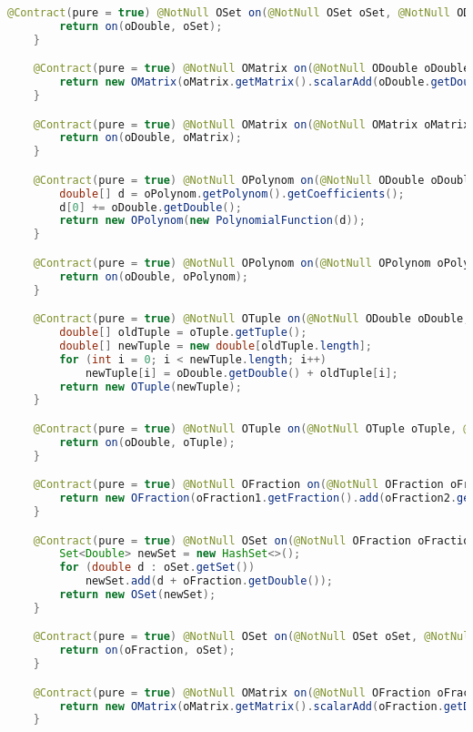 \begin{lstlisting}[caption=Plus (Falk),label=list:Plus,language=Java]
    @Contract(pure = true) @NotNull OSet on(@NotNull OSet oSet, @NotNull ODouble oDouble) {
        return on(oDouble, oSet);
    }

    @Contract(pure = true) @NotNull OMatrix on(@NotNull ODouble oDouble, @NotNull OMatrix oMatrix) {
        return new OMatrix(oMatrix.getMatrix().scalarAdd(oDouble.getDouble()));
    }

    @Contract(pure = true) @NotNull OMatrix on(@NotNull OMatrix oMatrix, @NotNull ODouble oDouble) {
        return on(oDouble, oMatrix);
    }

    @Contract(pure = true) @NotNull OPolynom on(@NotNull ODouble oDouble, @NotNull OPolynom oPolynom) {
        double[] d = oPolynom.getPolynom().getCoefficients();
        d[0] += oDouble.getDouble();
        return new OPolynom(new PolynomialFunction(d));
    }

    @Contract(pure = true) @NotNull OPolynom on(@NotNull OPolynom oPolynom, @NotNull ODouble oDouble) {
        return on(oDouble, oPolynom);
    }

    @Contract(pure = true) @NotNull OTuple on(@NotNull ODouble oDouble, @NotNull OTuple oTuple) {
        double[] oldTuple = oTuple.getTuple();
        double[] newTuple = new double[oldTuple.length];
        for (int i = 0; i < newTuple.length; i++)
            newTuple[i] = oDouble.getDouble() + oldTuple[i];
        return new OTuple(newTuple);
    }

    @Contract(pure = true) @NotNull OTuple on(@NotNull OTuple oTuple, @NotNull ODouble oDouble) {
        return on(oDouble, oTuple);
    }

    @Contract(pure = true) @NotNull OFraction on(@NotNull OFraction oFraction1, @NotNull OFraction oFraction2) {
        return new OFraction(oFraction1.getFraction().add(oFraction2.getFraction()));
    }

    @Contract(pure = true) @NotNull OSet on(@NotNull OFraction oFraction, @NotNull OSet oSet) {
        Set<Double> newSet = new HashSet<>();
        for (double d : oSet.getSet())
            newSet.add(d + oFraction.getDouble());
        return new OSet(newSet);
    }

    @Contract(pure = true) @NotNull OSet on(@NotNull OSet oSet, @NotNull OFraction oFraction) {
        return on(oFraction, oSet);
    }

    @Contract(pure = true) @NotNull OMatrix on(@NotNull OFraction oFraction, @NotNull OMatrix oMatrix) {
        return new OMatrix(oMatrix.getMatrix().scalarAdd(oFraction.getDouble()));
    }


\end{lstlisting}
